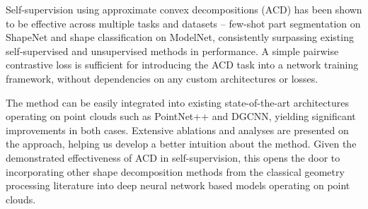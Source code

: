 Self-supervision using approximate convex decompositions (ACD) has
been shown to be effective across multiple tasks and datasets --
few-shot part segmentation on ShapeNet and shape classification on
ModelNet, consistently surpassing existing self-supervised and
unsupervised methods in performance.
A simple pairwise contrastive loss is sufficient for introducing the
ACD task into a network training framework, without dependencies on
any custom architectures or losses.

The method can be easily integrated into existing state-of-the-art
architectures operating on point clouds such as PointNet++ and DGCNN,
yielding significant improvements in both cases.
Extensive ablations and analyses are presented on the approach,
helping us develop a better intuition about the method.
Given the demonstrated effectiveness of ACD in self-supervision, this
opens the door to incorporating other shape decomposition methods from
the classical geometry processing literature into deep neural network
based models operating on point clouds.
